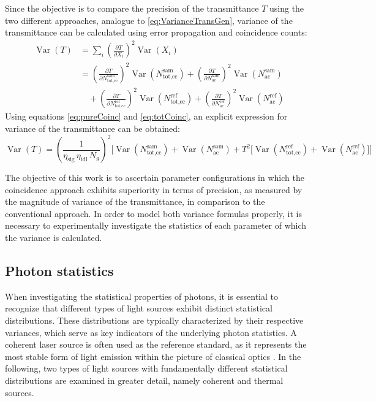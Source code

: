 Since the objective is to compare the precision of the transmittance $T$ using the two different approaches, analogue to \autoref{eq:VarianceTransGen}, variance of the transmittance can be calculated using error propagation and coincidence counts:
\begin{equation}
	\begin{aligned}
		\operatorname{Var}(T) 
		&= \sum_{i} \left( \frac{\partial T}{\partial X_i} \right)^{2} 
		\operatorname{Var}\!\left(X_i\right) \\[0.5em]
		&= \left( \frac{\partial T}{\partial N_{\text{tot,cc}}^{\text{sam}}} \right)^{2} 
		\operatorname{Var}\!\left(N_{\text{tot,cc}}^{\text{sam}}\right)
		+ \left( \frac{\partial T}{\partial N_{\text{ac}}^{\text{sam}}} \right)^{2} 
		\operatorname{Var}\!\left(N_{\text{ac}}^{\text{sam}}\right) \\[0.5em]
		&\quad + \left( \frac{\partial T}{\partial N_{\text{tot,cc}}^{\text{ref}}} \right)^{2} 
		\operatorname{Var}\!\left(N_{\text{tot,cc}}^{\text{ref}}\right)
		+ \left( \frac{\partial T}{\partial N_{\text{ac}}^{\text{ref}}} \right)^{2} 
		\operatorname{Var}\!\left(N_{\text{ac}}^{\text{ref}}\right)
	\end{aligned}
	\label{eq:VarianceTransGenCoinc}
\end{equation}
Using equations \ref{eq:pureCoinc} and \ref{eq:totCoinc}, an explicit expression for variance of the transmittance can be obtained:
 \begin{equation}
 	\operatorname{Var}(T) 
 	= \left( \frac{1}{\eta_{\text{sig}}\,\eta_{\text{idl}}\,N_g} \right)^{2}
 	\Bigg[
 	\operatorname{Var}\!\left(N_{\text{tot,cc}}^{\text{sam}}\right) 
 	+ \operatorname{Var}\!\left(N_{\text{ac}}^{\text{sam}}\right) 
 	+ T^{2} \Big[ 
 	\operatorname{Var}\!\left(N_{\text{tot,cc}}^{\text{ref}}\right) 
 	+ \operatorname{Var}\!\left(N_{\text{ac}}^{\text{ref}}\right) 
 	\Big]
 	\Bigg]
 	\label{eq:VarianceTransExplCoinc}
 \end{equation}
 
The objective of this work is to ascertain parameter configurations in which the coincidence approach exhibits superiority in terms of precision, as measured by the magnitude of variance of the transmittance, in comparison to the conventional approach. In order to model both variance formulas properly, it is necessary to experimentally investigate the statistics of each parameter of which the variance is calculated.
\subsection{Photon statistics}
When investigating the statistical properties of photons, it is essential to recognize that different types of light sources exhibit distinct statistical distributions. These distributions are typically characterized by their respective variances, which serve as key indicators of the underlying photon statistics. A coherent laser source is often used as the reference standard, as it represents the most stable form of light emission within the picture of classical optics \cite{foxQuantumOpticsIntroduction2006}. In the following, two types of light sources with fundamentally different statistical distributions are examined in greater detail, namely coherent and thermal sources.

